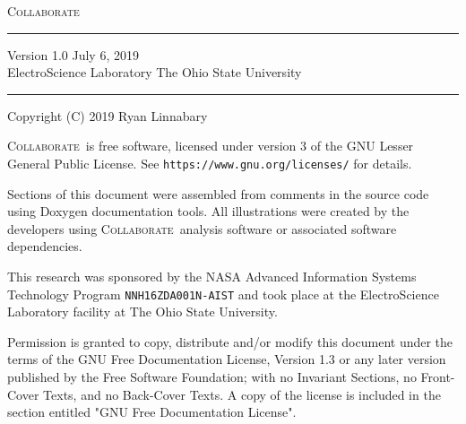 \documentclass[twoside, 12pt]{article}
\newcommand{\+}{\discretionary{\mbox{\scriptsize$\hookleftarrow$}}{}{}}
\newcommand{\project}{\textsc{Collaborate~}}
\begin{document}
\sloppy
\hypersetup{pageanchor=false, bookmarksnumbered=true, pdfencoding=unicode}


\begin{titlepage}
\vspace*{5cm}
{\Huge\project} \\
\noindent\rule{\textwidth}{4pt}
Version 1.0
\hfill
July 6, 2019 \\
\mbox{}
\vfill
{\large ElectroScience Laboratory \hfill The Ohio State University} \\
\noindent\rule{\textwidth}{2pt}
\end{titlepage}



\mbox{}
\vfill

Copyright (C) 2019  Ryan Linnabary

\project is free software, licensed under version 3 of the GNU Lesser General
Public License. See \texttt{https://www.gnu.org/licenses/} for details.

Sections of this document were assembled from comments in the source code using
Doxygen documentation tools.  All illustrations were created by the developers
using \project analysis software or associated software dependencies.

This research was sponsored by the NASA Advanced Information Systems Technology
Program \texttt{NNH16ZDA001N-AIST} and took place at the ElectroScience
Laboratory facility at The Ohio State University.

Permission is granted to copy, distribute and/or modify this document under the
terms of the GNU Free Documentation License, Version 1.3 or any later version
published by the Free Software Foundation; with no Invariant Sections, no
Front-Cover Texts, and no Back-Cover Texts.  A copy of the license is included
in the section entitled "GNU Free Documentation License".

\newpage


\tableofcontents
\hypersetup{pageanchor=true}

\newpage

\pagestyle{fancy}
\renewcommand{\sectionmark}[1]{\markright{#1}{}}
\renewcommand{\headheight}{15pt}
\fancyhead[LO,RE]{\rightmark}
\fancyhead[LE,RO]{\thepage}
\cfoot{}

\end{document}
